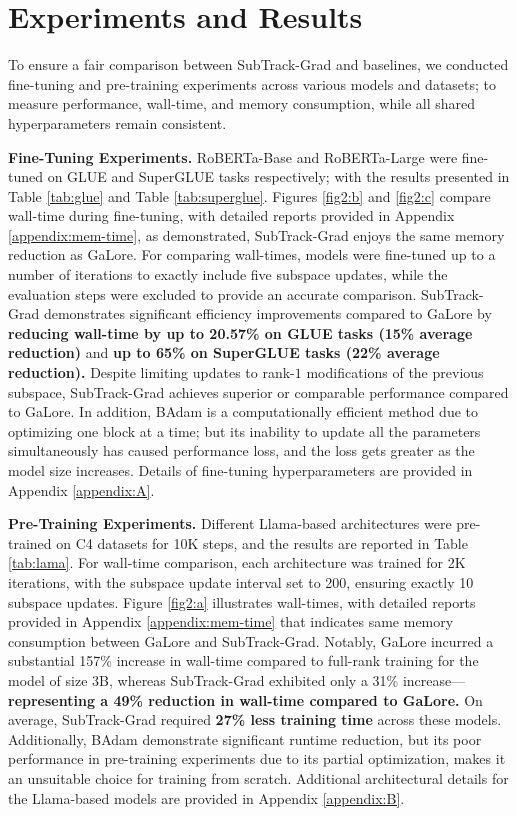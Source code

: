 \section{Experiments and Results}



To ensure a fair comparison between SubTrack-Grad and baselines, we conducted fine-tuning and pre-training experiments across various models and datasets; to measure performance, wall-time, and memory consumption, while all shared hyperparameters remain consistent.
\vspace{2pt}

\noindent\textbf{Fine-Tuning Experiments.} RoBERTa-Base and RoBERTa-Large were fine-tuned on GLUE and SuperGLUE tasks respectively; with the results presented in Table \ref{tab:glue} and Table \ref{tab:superglue}.   
Figures \ref{fig2:b} and \ref{fig2:c} compare wall-time during fine-tuning, with detailed reports provided in Appendix \ref{appendix:mem-time}, as demonstrated, SubTrack-Grad enjoys the same memory reduction as GaLore. For comparing wall-times, models were fine-tuned up to a number of iterations to exactly include five subspace updates, while the evaluation steps were excluded to provide an accurate comparison. 
SubTrack-Grad demonstrates significant efficiency improvements compared to GaLore by {\bf reducing wall-time by up to 20.57\% on GLUE tasks (15\% average reduction)} and {\bf up to 65\% on SuperGLUE tasks (22\% average reduction).} Despite limiting updates to rank-\(1\) modifications of the previous subspace, SubTrack-Grad achieves superior or comparable performance compared to GaLore. In addition, BAdam is a computationally efficient method due to optimizing one block at a time; but its inability to update all the parameters simultaneously has caused performance loss, and the loss gets greater as the model size increases. Details of fine-tuning hyperparameters are provided in Appendix \ref{appendix:A}.
\vspace{2pt}

\noindent\textbf{Pre-Training Experiments.} 
Different Llama-based architectures were pre-trained on C4 datasets for 10K steps, and the results are reported in Table \ref{tab:lama}.
For wall-time comparison, each architecture was trained for 2K iterations, with the subspace update interval set to 200, ensuring exactly 10 subspace updates. 
Figure \ref{fig2:a} illustrates wall-times, with detailed reports provided in Appendix \ref{appendix:mem-time} that indicates same memory consumption between GaLore and SubTrack-Grad. 
Notably, GaLore incurred a substantial 157\% increase in wall-time compared to full-rank training for the model of size 3B, whereas SubTrack-Grad exhibited only a 31\% increase—{\bf representing a 49\% reduction in wall-time compared to GaLore.} On average, SubTrack-Grad required {\bf 27\% less training time} across these models. Additionally, BAdam demonstrate significant runtime reduction, but its poor performance in pre-training experiments due to its partial optimization, makes it an unsuitable choice for training from scratch. Additional architectural details for the Llama-based models are provided in Appendix \ref{appendix:B}.

\vspace{2pt}

